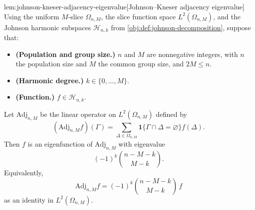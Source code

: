 \documentclass[11pt]{article}
\begin{document}
\begin{lemmav}{lem:johnson-kneser-adjacency-eigenvalue}[Johnson--Kneser adjacency eigenvalue]
Using the uniform \(M\)-slice \(\Omega_{n,M}\), the slice function space \(L^2(\Omega_{n,M})\), and the Johnson harmonic subspaces \(\mathcal H_{n,k}\) from \cref{obj:def:johnson-decomposition}, suppose that:
\begin{itemize}
\item \textbf{(Population and group size.)} \(n\) and \(M\) are nonnegative integers, with \(n\) the population size and \(M\) the common group size, and \(2M\le n\).
\item \textbf{(Harmonic degree.)} \(k\in\{0,\ldots,M\}\).
\item \textbf{(Function.)} \(f\in\mathcal H_{n,k}\).
\end{itemize}
Let \(\mathrm{Adj}_{n,M}\) be the linear operator on \(L^2(\Omega_{n,M})\) defined by
\[
(\mathrm{Adj}_{n,M}f)(\Gamma)
=
\sum_{\Delta\in\Omega_{n,M}}
\mathbf 1\{\Gamma\cap\Delta=\varnothing\}f(\Delta).
\]
Then \(f\) is an eigenfunction of \(\mathrm{Adj}_{n,M}\) with eigenvalue
\[
(-1)^k\binom{n-M-k}{M-k}.
\]
Equivalently,
\[
\mathrm{Adj}_{n,M}f
=
(-1)^k\binom{n-M-k}{M-k}\,f
\]
as an identity in \(L^2(\Omega_{n,M})\).
\end{lemmav}
\end{document}
